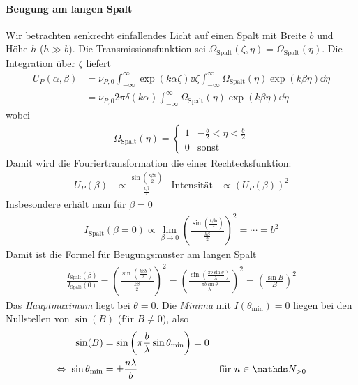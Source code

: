 \paragraph{Beugung am langen Spalt}
Wir betrachten senkrecht einfallendes Licht auf einen Spalt mit Breite
$b$ und Höhe $h$ ($h\gg b$). Die Transmissionsfunktion sei 
$\Omega_\text{Spalt}(\zeta,\eta) = \Omega_\text{Spalt}(\eta)$.
Die Integration über $\zeta$ liefert
\begin{align*}
  U_P(\alpha,\beta) 
  &= \nu_{P,0} 
    \int_{-\infty}^{\infty} \exp(k\alpha\zeta)\dd\zeta
    \int_{-\infty}^{\infty} \Omega_\text{Spalt}(\eta)\exp(k\beta\eta)\dd\eta\\
  &= \nu_{P,0} 2\pi\delta(k\alpha)
    \int_{-\infty}^{\infty} \Omega_\text{Spalt}(\eta)\exp(k\beta\eta)\dd\eta
\end{align*}
wobei
\begin{gather*}
  \Omega_\text{Spalt}(\eta) = 
  \begin{cases}
    1 & -\frac{b}{2} < \eta < \frac{b}{2}\\
    0 & \text{sonst}
  \end{cases}
\end{gather*}
Damit wird die Fouriertransformation die einer Rechtecksfunktion:
\begin{align*}
  U_P(\beta) 
  &\propto \frac{\sin(\frac{k\beta b}{2})}{\frac{k\beta}{2}}
  &\text{Intensität}
  &\propto (U_P(\beta))^2
\end{align*}
Insbesondere erhält man für $\beta=0$ 
\begin{gather*}
  I_\text{Spalt}(\beta=0) 
  \propto \lim_{\beta\to0} \left(
    \frac{\sin(\frac{k\beta b}{2})}{\frac{k\beta}{2}}
  \right)^2
  = \dotsb = b^2
\end{gather*}
Damit ist die Formel für Beugungsmuster am langen Spalt
\begin{gather*}
  \frac{I_\text{Spalt}(\beta)}{I_\text{Spalt}(0)}
  = \left(
    \frac{\sin(\frac{k\beta b}{2})}{\frac{k\beta}{2}}
  \right)^2
  = \left(
    \frac{\sin(\frac{\pi b\sin\theta}{\lambda})}
    {\frac{\pi b\sin\theta}{\lambda}}
  \right)^2
  = \left(\frac{\sin B}{B}\right)^2
\end{gather*}
Das \emph{Hauptmaximum} liegt bei $\theta=0$.
Die \emph{Minima} mit $I(\theta_\text{min})=0$ liegen bei den Nullstellen von
$\sin(B)$ (für $B\neq 0$), also 
\begin{align*}
  \sin(B) &= \sin\left(
            \pi\frac{b}{\lambda}\sin\theta_\text{min}
            \right) = 0\\
  \Leftrightarrow\;
  \sin\theta_\text{min} &= \pm\frac{n\lambda}{b}
                        & \text{für } n\in\N_{>0}
\end{align*}
